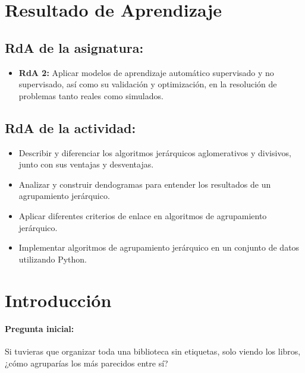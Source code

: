 \documentclass[a4,11pt]{aleph-notas}
\begin{document}
\encabezado

\section*{Resultado de Aprendizaje}

\subsection*{RdA de la asignatura:}
\begin{itemize}[leftmargin=*]
    \item \textbf{RdA 2:} 
    Aplicar modelos de aprendizaje automático supervisado y no supervisado, así como su validación y optimización, en la resolución de problemas tanto reales como simulados.
\end{itemize}

\subsection*{RdA de la actividad:}

\begin{itemize}[leftmargin=*]
    \item Describir y diferenciar los algoritmos jerárquicos aglomerativos y divisivos, junto con sus ventajas y desventajas.
    \item Analizar y construir dendogramas para entender los resultados de un agrupamiento jerárquico.
    \item Aplicar diferentes criterios de enlace en algoritmos de agrupamiento jerárquico.
    \item Implementar algoritmos de agrupamiento jerárquico en un conjunto de datos utilizando Python.

\end{itemize}


\section*{Introducción}

\paragraph{Pregunta inicial:} 
 Si tuvieras que organizar toda una biblioteca sin etiquetas, solo viendo los libros, ¿cómo agruparías los más parecidos entre sí?
\end{document}
